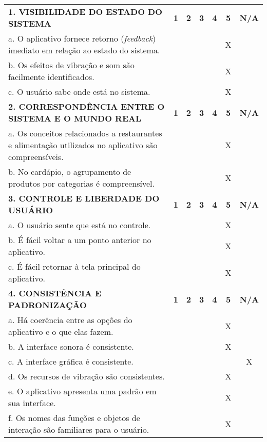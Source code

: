 \documentclass[portuguese,oneside]{tcc}
\begin{document}
\begin{center}
\begin{longtabu}{|L{25em}|c|c|c|c|c|c|}
								\textbf{1. VISIBILIDADE DO ESTADO DO SISTEMA} & \textbf{1} & \textbf{2} & \textbf{3} & \textbf{4} & \textbf{5} & \textbf{N/A} \\ 
								a. O aplicativo fornece retorno (\emph{feedback}) imediato em relação ao estado do sistema. & & & & & X & \\ 
								b. Os efeitos de vibração e som são facilmente identificados. & & & & & X & \\ 
								c. O usuário sabe onde está no sistema.	 & & & & & X & \\ 
								\textbf{2. CORRESPONDÊNCIA ENTRE O SISTEMA E O MUNDO REAL} & \textbf{1} & \textbf{2} & \textbf{3} & \textbf{4} & \textbf{5} & \textbf{N/A} \\ 
								a. Os conceitos relacionados a restaurantes e alimentação utilizados no aplicativo são compreensíveis. & & & & & X & \\ 
								b. No cardápio, o agrupamento de produtos por categorias é compreensível. & & & & & X & \\ 
								\textbf{3. CONTROLE E LIBERDADE DO USUÁRIO} & \textbf{1} & \textbf{2} & \textbf{3} & \textbf{4} & \textbf{5} & \textbf{N/A} \\ 
								a. O usuário sente que está no controle. & & & & & X & \\ 
								b. É fácil voltar a um ponto anterior no aplicativo. & & & & & X & \\ 
								c. É fácil retornar à tela principal do aplicativo. & & & & & X & \\ 
								\textbf{4. CONSISTÊNCIA E PADRONIZAÇÃO} & \textbf{1} & \textbf{2} & \textbf{3} & \textbf{4} & \textbf{5} & \textbf{N/A} \\ 
								a. Há coerência entre as opções do aplicativo e o que elas fazem. & & & & & X & \\ 
								b. A interface sonora é consistente. & & & & & X & \\ 
								c. A interface gráfica é consistente. & & & & & & X \\ 
								d. Os recursos de vibração são consistentes. & & & & & X & \\ 
								e. O aplicativo apresenta uma padrão em sua interface. & & & & & X & \\ 
								f. Os nomes das funções e objetos de interação são familiares para o usuário. & & & & & X & \\ 

\end{longtabu}
\end{center}
\end{document}
